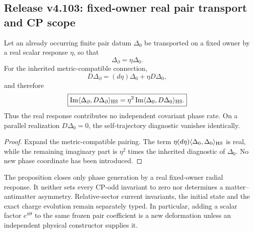 \documentclass[12pt,a4paper]{article}
\begin{document}



\subsection{Release v4.103: fixed-owner real pair transport and CP scope}
\label{p4:sec:v4103-fixed-owner-pair-phase-scope}

\begin{proposition}
\label{p4:prop:v4103-real-pair-response-no-new-phase}
Let an already occurring finite pair datum $\Delta_0$ be transported on a
fixed owner by a real scalar response $\eta$, so that
\[
 \Delta_\partial=\eta\Delta_0.
\]
For the inherited metric-compatible connection,
\[
 D\Delta_\partial=(d\eta)\Delta_0+\eta D\Delta_0,
\]
and therefore
\[
 \boxed{
 \operatorname{Im}\langle\Delta_\partial,D\Delta_\partial\rangle_{\rm HS}
 =\eta^2\operatorname{Im}\langle\Delta_0,D\Delta_0\rangle_{\rm HS}.}
\]
Thus the real response contributes no independent covariant phase rate.  On a
parallel realization $D\Delta_0=0$, the self-trajectory diagnostic vanishes
identically.
\end{proposition}

\begin{proof}
Expand the metric-compatible pairing.  The term
$\eta(d\eta)\langle\Delta_0,\Delta_0\rangle_{\rm HS}$ is real, while the
remaining imaginary part is $\eta^2$ times the inherited diagnostic of
$\Delta_0$.  No new phase coordinate has been introduced.
\end{proof}

\begin{remark}
\label{p4:rem:v4103-relative-sector-cp}
The proposition closes only phase generation by a real fixed-owner radial
response.  It neither sets every CP-odd invariant to zero nor determines a
matter--antimatter asymmetry.  Relative-sector current invariants, the initial
state and the exact charge evolution remain separately typed.  In particular,
adding a scalar factor $e^{i\Theta}$ to the same frozen pair coefficient is a
new deformation unless an independent physical constructor supplies it.
\end{remark}



\end{document}
